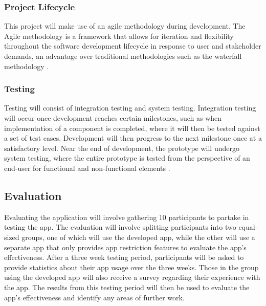 \documentclass[12pt]{article}
\begin{document}
\subsubsection {Project Lifecycle}
This project will make use
of an agile methodology during development. The Agile methodology is a framework that allows for iteration
and flexibility throughout the software development lifecycle in response to user and stakeholder demands, an
advantage over traditional methodologies such as the waterfall methodology 
\autocite{RefWorks:RefID:149-al-saqqa2020agile, RefWorks:RefID:148-altameem2015impact}.
 
\subsubsection{Testing}
Testing will consist of integration testing and system testing. Integration testing will occur once
development reaches certain milestones, such as when implementation of a component is
completed, where it will then be tested against a set of test cases. Development will then progress to the next 
milestone once at a satisfactory level. Near the end of development, the prototype
will undergo system testing, where the entire prototype is tested from the perspective of an end-user for 
functional and non-functional elements \autocite{RefWorks:RefID:150-loikkanen2024improving}.

\subsection{Evaluation}

Evaluating the application will involve gathering 10 participants to partake in testing the app. The evaluation will 
involve splitting participants into two equal-sized groups, one of which will use the
developed app, while the other will use a separate app that only provides app restriction features to evaluate the 
app's effectiveness. After a three week testing period, participants will be asked to provide statistics about their 
app usage over the three weeks. Those in the group using the developed app will also receive a survey regarding their 
experience with the app. The results from this testing period will then be used to evaluate the app's effectiveness 
and identify any areas of further work.
\end{document}
